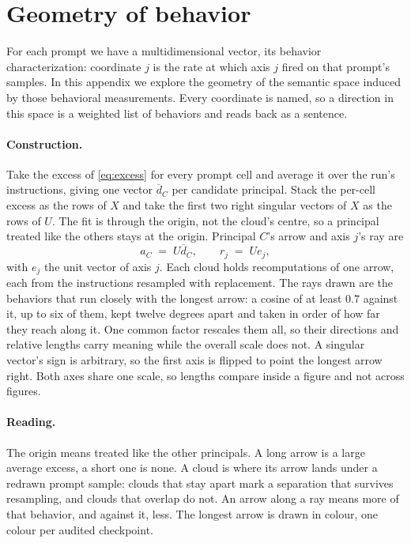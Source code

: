 \section{Geometry of behavior}
\label{app:geometry}

For each prompt we have a multidimensional vector, its behavior
characterization: coordinate $j$ is the rate at which axis $j$ fired on that
prompt's samples.
In this appendix we explore the geometry of the semantic space induced by those
behavioral measurements.
Every coordinate is named, so a direction in this space is a weighted list of
behaviors and reads back as a sentence.

\paragraph{Construction.}
Take the excess of \autoref{eq:excess} for every prompt cell and average it over
the run's instructions, giving one vector $\overline{d}_C$ per candidate
principal.
Stack the per-cell excess as the rows of $X$ and take the first two right
singular vectors of $X$ as the rows of $U$.
The fit is through the origin, not the cloud's centre, so a principal treated
like the others stays at the origin.
Principal $C$'s arrow and axis $j$'s ray are
\begin{equation}
  a_C \;=\; U \overline{d}_C, \qquad r_j \;=\; U e_j,
  \label{eq:biplot-projection}
\end{equation}
with $e_j$ the unit vector of axis $j$.
Each cloud holds \GeoBootDraws{} recomputations of one arrow, each from the
instructions resampled with replacement.
The rays drawn are the behaviors that run closely with the longest arrow: a
cosine of at least $0.7$ against it, up to six of them, kept twelve degrees
apart and taken in order of how far they reach along it.
One common factor rescales them all, so their directions and relative lengths
carry meaning while the overall scale does not.
A singular vector's sign is arbitrary, so the first axis is flipped to point the
longest arrow right.
Both axes share one scale, so lengths compare inside a figure and not across
figures.

\paragraph{Reading.}
The origin means treated like the other principals.
A long arrow is a large average excess, a short one is none.
A cloud is where its arrow lands under a redrawn prompt sample: clouds that stay
apart mark a separation that survives resampling, and clouds that overlap do
not.
An arrow along a ray means more of that behavior, and against it, less.
The longest arrow is drawn in colour, one colour per audited checkpoint.

